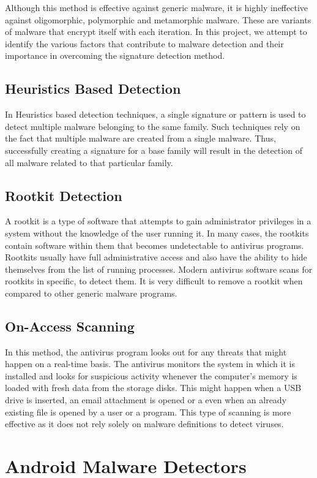 	Although this method is effective against generic malware, it is highly ineffective against oligomorphic, polymorphic and metamorphic malware. These are variants of malware that encrypt itself with each iteration. In this project, we attempt to identify the various factors that contribute to malware detection and their importance in overcoming the signature detection method.

\subsection{Heuristics Based Detection}
	In Heuristics based detection techniques, a single signature or pattern is used to detect multiple malware belonging to the same family. Such techniques rely on the fact that multiple malware are created from a single malware. Thus, successfully creating a signature for a base family will result in the detection of all malware related to that particular family.
\subsection{Rootkit Detection}
	A rootkit is a type of software that attempts to gain administrator privileges in a system without the knowledge of the user running it. In many cases, the rootkits contain software within them that becomes undetectable to antivirus programs. Rootkits usually have full administrative access and also have the ability to hide themselves from the list of running processes. Modern antivirus software scans for rootkits in specific, to detect them. It is very difficult to remove a rootkit when compared to other generic malware programs.
\subsection{On-Access Scanning}
	In this method, the antivirus program looks out for any threats that might happen on a real-time basis. The antivirus monitors the system in which it is installed and looks for suspicious activity whenever the computer's memory is loaded with fresh data from the storage disks. This might happen when a USB drive is inserted, an email attachment is opened or a even when an already existing file is opened by a user or a program.
	This type of scanning is more effective as it does not rely solely on malware definitions to detect viruses.

\section{Android Malware Detectors}

